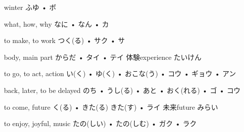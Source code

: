 



\setcounter{cardnum}{17}

		{winter}
		{ふゆ • ボ}
		{}{}
		{}{}
		{}{}
		{}{}
		{}{}

		{what, how, why}
		{なに • なん • カ}
		{}{}
		{}{}
		{}{}
		{}{}
		{}{}

		{to make, to work}
		{つく(る) • サク • サ}
		{}{}
		{}{}
		{}{}
		{}{}
		{}{}

		{body, main part}
		{からだ • タイ • テイ}
		{体験}{experience たいけん}
		{}{}
		{}{}
		{}{}
		{}{}

		{to go, to act, action}
		{い(く) • ゆ(く) • おこな(う) • コウ • ギョウ • アン}
		{}{}
		{}{}
		{}{}
		{}{}
		{}{}

		{back, later, to be delayed}
		{のち • うし(る) • あと • おく(れる) • ゴ • コウ}
		{}{}
		{}{}
		{}{}
		{}{}
		{}{}

		{to come, future}
		{く(る) • きた(る) きた(す) • ライ}
		{未来}{future みらい}
		{}{}
		{}{}
		{}{}
		{}{}

		{to enjoy, joyful, music}
		{たの(しい) • たの(しむ) • ガク • ラク}
		{}{}
		{}{}
		{}{}
		{}{}
		{}{}

